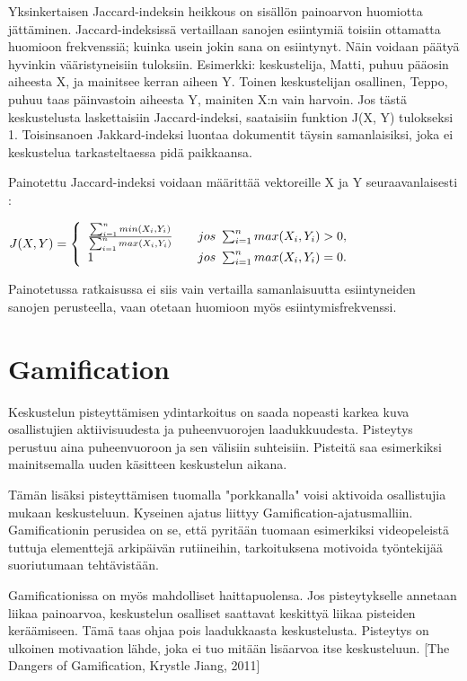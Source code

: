 \documentclass[11pt,a4paper,oneside]{memoir}
\begin{document}
Yksinkertaisen Jaccard-indeksin heikkous on sisällön painoarvon huomiotta jättäminen. Jaccard-indeksissä vertaillaan sanojen esiintymiä toisiin ottamatta huomioon frekvenssiä; kuinka usein jokin sana on esiintynyt. Näin voidaan päätyä hyvinkin vääristyneisiin tuloksiin. Esimerkki: keskustelija, Matti, puhuu pääosin aiheesta X, ja mainitsee kerran aiheen Y. Toinen keskustelijan osallinen, Teppo, puhuu taas päinvastoin aiheesta Y, mainiten X:n vain harvoin. Jos tästä keskustelusta laskettaisiin Jaccard-indeksi, saataisiin funktion J(X, Y) tulokseksi 1. Toisinsanoen Jakkard-indeksi luontaa dokumentit täysin samanlaisiksi, joka ei keskustelua tarkasteltaessa pidä paikkaansa.

Painotettu Jaccard-indeksi voidaan määrittää vektoreille X ja Y seuraavanlaisesti \cite[s. 2]{finding-the-jaccard-median}:

\begin{math}
  J(X, Y) = \left\{ 
  \begin{array}{l l}
	\frac{\sum^n_{i=1} min(X_i, Y_i)}{\sum^n_{i=1} max(X_i, Y_i)} & \quad \text{$jos$ } \sum^n_{i=1} max(X_i, Y_i) > 0,\\
	1 & \quad \text{$jos$ } \sum^n_{i=1} max(X_i, Y_i) = 0.\\	
  \end{array} \right.
\end{math}

Painotetussa ratkaisussa ei siis vain vertailla samanlaisuutta esiintyneiden sanojen perusteella, vaan otetaan huomioon myös esiintymisfrekvenssi.

\section{Gamification}
Keskustelun pisteyttämisen ydintarkoitus on saada nopeasti karkea kuva osallistujien aktiivisuudesta ja puheenvuorojen laadukkuudesta. Pisteytys perustuu aina puheenvuoroon ja sen välisiin suhteisiin. Pisteitä saa esimerkiksi mainitsemalla uuden käsitteen keskustelun aikana.

Tämän lisäksi pisteyttämisen tuomalla "porkkanalla" voisi aktivoida osallistujia mukaan keskusteluun. Kyseinen ajatus liittyy Gamification-ajatusmalliin. Gamificationin perusidea on se, että pyritään tuomaan esimerkiksi videopeleistä tuttuja elementtejä arkipäivän rutiineihin, tarkoituksena motivoida työntekijää suoriutumaan tehtävistään.

Gamificationissa on myös mahdolliset haittapuolensa. Jos pisteytykselle annetaan liikaa painoarvoa, keskustelun osalliset saattavat keskittyä liikaa pisteiden keräämiseen. Tämä taas ohjaa pois laadukkaasta keskustelusta. Pisteytys on ulkoinen motivaation lähde, joka ei tuo mitään lisäarvoa itse keskusteluun. [The Dangers of Gamification, Krystle Jiang, 2011]
\end{document}
